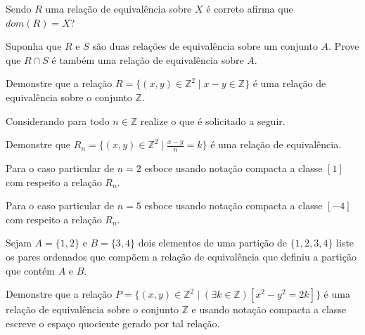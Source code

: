 \begin{problem}\label{prob:EquivalenciaOrdem6}
	Sendo $R$ uma relação de equivalência sobre $X$ é correto afirma que $dom(R) = X$?
\end{problem}

\begin{problem}\label{prob:EquivalenciaOrdem7}
	Suponha que  $R$ e $S$ são duas relações de equivalência sobre um conjunto $A$. Prove que $R \cap S$ é também uma relação de equivalência sobre $A$.
\end{problem}

\begin{problem}\label{prob:EquivalenciaOrdem8}
	Demonstre que a relação $R = \{(x, y) \in \mathbb{Z}^2 \mid x - y \in \mathbb{Z} \}$ é uma relação de equivalência sobre o conjunto $\mathbb{Z}$.
\end{problem}

\begin{problem}\label{prob:EquivalenciaOrdem9}
	Considerando para todo $n \in \mathbb{Z}$ realize o que é solicitado a seguir.
\end{problem}

\begin{exerList}
	\item Demonstre que $R_n = \{(x, y) \in \mathbb{Z}^2 \mid \displaystyle\frac{x - y}{n} = k\}$ é uma relação de equivalência.
	\item Para o caso particular de $n = 2$ esboce usando notação compacta a classe $[1]$ com respeito a relação $R_n$.
	\item Para o caso particular de $n = 5$ esboce usando notação compacta a classe $[-4]$ com respeito a relação $R_n$.
\end{exerList}

\begin{problem}\label{prob:EquivalenciaOrdem10}
	Sejam $A = \{1, 2\}$ e $B = \{3, 4\}$ dois elementos de uma partição de $\{1, 2, 3, 4\}$ liste os pares ordenados que compõem a relação de equivalência que definiu a partição que contém $A$ e $B$.
\end{problem}

\begin{problem}\label{prob:EquivalenciaOrdem11}
	Demonstre que a relação $P = \{(x, y) \in \mathbb{Z}^2 \mid (\exists k \in \mathbb{Z})[x^2 - y^2 = 2k]\}$ é uma relação de equivalência sobre o conjunto $\mathbb{Z}$ e usando notação compacta a classe escreve o espaço quociente gerado por tal relação.
\end{problem}

